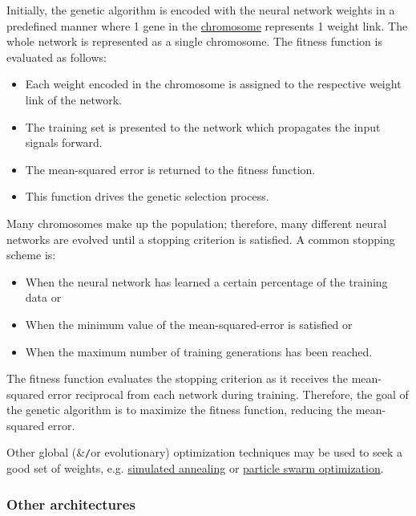 \documentclass{article}
\begin{document}
\begin{itemize}
	Initially, the genetic algorithm is encoded with the neural network weights in a predefined manner where 1 gene in the \href{https://en.wikipedia.org/wiki/Chromosome_(genetic_algorithm)}{chromosome} represents 1 weight link. The whole network is represented as a single chromosome. The fitness function is evaluated as follows:
	\begin{itemize}
		\item Each weight encoded in the chromosome is assigned to the respective weight link of the network.
		\item The training set is presented to the network which propagates the input signals forward.
		\item The mean-squared error is returned to the fitness function.
		\item This function drives the genetic selection process.
	\end{itemize}
	Many chromosomes make up the population; therefore, many different neural networks are evolved until a stopping criterion is satisfied. A common stopping scheme is:
	\begin{itemize}
		\item When the neural network has learned a certain percentage of the training data or
		\item When the minimum value of the mean-squared-error is satisfied or
		\item When the maximum number of training generations has been reached.
	\end{itemize}
	The fitness function evaluates the stopping criterion as it receives the mean-squared error reciprocal from each network during training. Therefore, the goal of the genetic algorithm is to maximize the fitness function, reducing the mean-squared error.
	
	Other global (\&{\tt/}or evolutionary) optimization techniques may be used to seek a good set of weights, e.g. \href{https://en.wikipedia.org/wiki/Simulated_annealing}{simulated annealing} or \href{https://en.wikipedia.org/wiki/Particle_swarm_optimization}{particle swarm optimization}.
\end{itemize}

\subsubsection{Other architectures}
\end{document}
